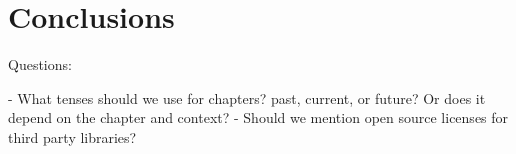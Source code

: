 \chapter{Conclusions}






Questions:

- What tenses should we use for chapters? past, current, or future? Or does it depend on the chapter and context?
- Should we mention open source licenses for third party libraries?
